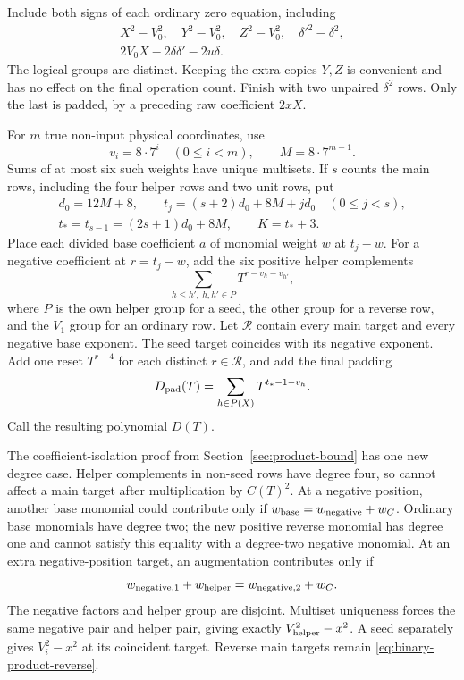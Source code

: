 Include both signs of each ordinary zero equation, including
\begin{equation}\label{eq:binary-product-normalization}
\begin{gathered}
 X^2-V_0^2,\quad Y^2-V_0^2,\quad Z^2-V_0^2,\quad
 \delta'^2-\delta^2,\\
 2V_0X-2\delta\delta'-2u\delta.
\end{gathered}
\end{equation}
The logical groups are distinct. Keeping the extra copies $Y,Z$ is
convenient and has no effect on the final operation count. Finish with
two unpaired $\delta^2$ rows. Only the last is padded, by a preceding
raw coefficient $2xX$.

For $m$ true non-input physical coordinates, use
\[
 v_i=8\cdot7^i\quad(0\le i<m),\qquad M=8\cdot7^{m-1}.
\]
Sums of at most six such weights have unique multisets. If $s$ counts
the main rows, including the four helper rows and two unit rows, put
\begin{equation}\label{eq:binary-product-layout}
\begin{gathered}
 d_0=12M+8,\qquad
 t_j=(s+2)d_0+8M+jd_0\quad(0\le j<s),\\
 t_*=t_{s-1}=(2s+1)d_0+8M,\qquad K=t_*+3.
\end{gathered}
\end{equation}
Place each divided base coefficient $a$ of monomial weight $w$ at
$t_j-w$. For a negative coefficient at $r=t_j-w$, add the six
positive helper complements
\begin{equation}\label{eq:binary-product-complements}
 \sum_{h\le h',\ h,h'\in P}T^{r-v_h-v_{h'}},
\end{equation}
where $P$ is the own helper group for a seed, the other group for a
reverse row, and the $V_1$ group for an ordinary row. Let $\mathcal R$
contain every main target and every negative base exponent. The seed
target coincides with its negative exponent. Add one reset $T^{r-4}$
for each distinct $r\in\mathcal R$, and add the final padding
\begin{equation}\label{eq:binary-product-padding}
 D_{\rm pad}(T)=\sum_{h\in P(X)}T^{t_*-1-v_h}.
\end{equation}
Call the resulting polynomial $D(T)$.

The coefficient-isolation proof from Section~\ref{sec:product-bound}
has one new degree case. Helper complements in non-seed rows have
degree four, so cannot affect a main target after multiplication by
$C(T)^2$. At a negative position, another base monomial could
contribute only if
$w_{\rm base}=w_{\rm negative}+w_C$. Ordinary base monomials have
degree two; the new positive reverse monomial has degree one and
cannot satisfy this equality with a degree-two negative monomial.
At an extra negative-position target, an augmentation contributes
only if
\[
 w_{{\rm negative},1}+w_{\rm helper}
   =w_{{\rm negative},2}+w_C.
\]
The negative factors and helper group are disjoint. Multiset uniqueness
forces the same negative pair and helper pair, giving exactly
$V_{\rm helper}^2-x^2$. A seed separately gives $V_i^2-x^2$ at its
coincident target. Reverse main targets remain
\eqref{eq:binary-product-reverse}.

